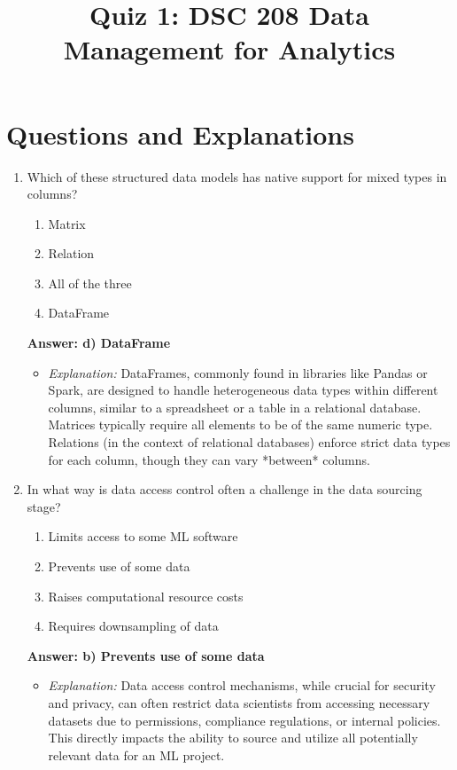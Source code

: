 \documentclass{article}
\title{Quiz 1: DSC 208 Data Management for Analytics}
\author{}
\date{}
\begin{document}
\maketitle

\section*{Questions and Explanations}

\begin{enumerate}[label=\textbf{Question \arabic*.}]

\item Which of these structured data models has native support for mixed types in columns?
    \begin{enumerate}[label=\alph*)]
        \item Matrix
        \item Relation
        \item All of the three
        \item DataFrame
    \end{enumerate}
    \textbf{Answer: d) DataFrame}
    \begin{itemize}
        \item \textit{Explanation:} DataFrames, commonly found in libraries like Pandas or Spark, are designed to handle heterogeneous data types within different columns, similar to a spreadsheet or a table in a relational database. Matrices typically require all elements to be of the same numeric type. Relations (in the context of relational databases) enforce strict data types for each column, though they can vary *between* columns.
    \end{itemize}

\item In what way is data access control often a challenge in the data sourcing stage?
    \begin{enumerate}[label=\alph*)]
        \item Limits access to some ML software
        \item Prevents use of some data
        \item Raises computational resource costs
        \item Requires downsampling of data
    \end{enumerate}
    \textbf{Answer: b) Prevents use of some data}
    \begin{itemize}
        \item \textit{Explanation:} Data access control mechanisms, while crucial for security and privacy, can often restrict data scientists from accessing necessary datasets due to permissions, compliance regulations, or internal policies. This directly impacts the ability to source and utilize all potentially relevant data for an ML project.
    \end{itemize}


\end{enumerate}
\end{document}
